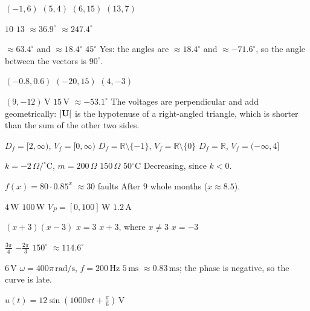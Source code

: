 
\begin{facit}

  $(-1, 6)$  $(5, 4)$  $(6, 15)$  $(13, 7)$

  $10$  $13$  $\approx 36.9^{\circ}$  $\approx 247.4^{\circ}$

  $\approx 63.4^{\circ}$ and $\approx 18.4^{\circ}$  $45^{\circ}$
 Yes: the angles are $\approx 18.4^{\circ}$ and $\approx -71.6^{\circ}$, so the angle between
the vectors is $90^{\circ}$.

  $(-0.8, 0.6)$  $(-20, 15)$  $(4, -3)$

  $(9, -12)\,\text{V}$  $15\,\text{V}$  $\approx -53.1^{\circ}$
 The voltages are perpendicular and add geometrically: $\lvert\mathbf{U}\rvert$ is the hypotenuse
of a right-angled triangle, which is shorter than the sum of the other two sides.

  $D_f = [2, \infty)$, $V_f = [0, \infty)$
 $D_f = \mathbb{R} \setminus \{-1\}$, $V_f = \mathbb{R} \setminus \{0\}$
 $D_f = \mathbb{R}$, $V_f = (-\infty, 4]$

  $k = -2\,\Omega/^{\circ}\text{C}$, $m = 200\,\Omega$  $150\,\Omega$
 $50^{\circ}\text{C}$  Decreasing, since $k < 0$.

  $f(x) = 80 \cdot 0.85^x$  $\approx 30$ faults
 After $9$ whole months ($x \approx 8.5$).

  $4\,\text{W}$  $100\,\text{W}$  $V_P = [0, 100]\,\text{W}$
 $1.2\,\text{A}$

  $(x + 3)(x - 3)$  $x = 3$  $x + 3$, where $x \neq 3$
 $x = -3$

  $\frac{3\pi}{4}$  $-\frac{2\pi}{3}$  $150^{\circ}$
 $\approx 114.6^{\circ}$

  $6\,\text{V}$  $\omega = 400\pi\,\text{rad/s}$, $f = 200\,\text{Hz}$
 $5\,\text{ms}$  $\approx 0.83\,\text{ms}$; the phase is negative, so the curve is
late.

 $u(t) = 12\sin\left(1000\pi t + \frac{\pi}{6}\right)\,\text{V}$


\end{facit}
